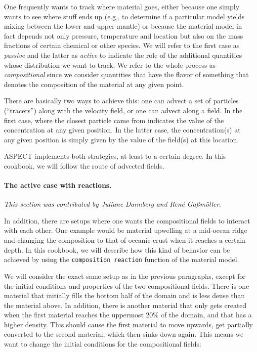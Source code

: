 \documentclass{article}
\newcommand{\aspect}{\textsc{ASPECT}}
\begin{document}
One frequently wants to track where material goes, either because one simply
wants to see where stuff ends up (e.g., to determine if a particular model
yields mixing between the lower and upper mantle) or because the material model
in fact depends not only pressure, temperature and location but also on the
mass fractions of certain chemical or other species. We will refer to the first
case as \textit{passive} and the latter as \textit{active} to indicate the role
of the additional quantities whose distribution we want to track. We refer to
the whole process as \textit{compositional} since we consider quantities that
have the flavor of something that denotes the composition of the material at any
given point.

There are basically two ways to achieve this: one can advect a set of
particles (``tracers'') along with the velocity field, or one can advect along a
field. In the first case, where the closest particle came from indicates the
value of the concentration at any given position. In the latter case, the
concentration(s) at any given position is simply given by the value of the
field(s) at this location.

\aspect{} implements both strategies, at least to a certain degree. In this
cookbook, we will follow the route of advected fields.










\paragraph{The active case with reactions.}

\textit{This section was contributed by Juliane Dannberg and Ren{\'e} Ga{\ss}m{\"o}ller}.

In addition, there are setups where one wants the compositional fields to interact with each other. One example would be material upwelling at a mid-ocean ridge and changing the composition to that of oceanic crust when it reaches a certain depth. In this cookbook, we will describe how this kind of behavior can be achieved by using the \texttt{composition reaction} function of the material model.

We will consider the exact same setup as in the previous paragraphs, except for the initial conditions and properties of the two compositional fields. There is one material that initially fills the bottom half of the domain and is less dense than the material above. In addition, there is another material that only gets created when the first material reaches the uppermost 20\% of the domain, and that has a higher density. This should cause the first material to move upwards, get partially converted to the second material, which then sinks down again. This means we want to change the initial conditions for the compositional fields:
\end{document}

